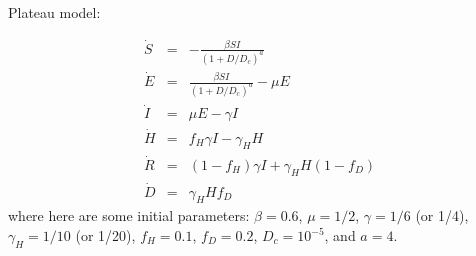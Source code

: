 \documentclass[12pt]{article}
\begin{document}
Plateau model:

\begin{eqnarray}
\dot{S} &=& -\frac{\beta SI}{\left(1+D/D_c\right)^{a}}\\
\dot{E} &=& \frac{\beta SI}{\left(1+D/D_c\right)^{a}}-\mu E\\
\dot{I} &=& \mu E-\gamma I \\
\dot{H} &=& f_H\gamma I-\gamma_H H \\
\dot{R} &=& (1-f_H)\gamma I+\gamma_HH(1-f_D) \\
\dot{D} &=& \gamma_H H f_D
\end{eqnarray}
where here are some initial parameters:
$\beta=0.6$, $\mu=1/2$, $\gamma=1/6$ (or 1/4), $\gamma_H=1/10$
(or 1/20), $f_H=0.1$, $f_D=0.2$, $D_c=10^{-5}$, and $a=4$.
\end{document}
